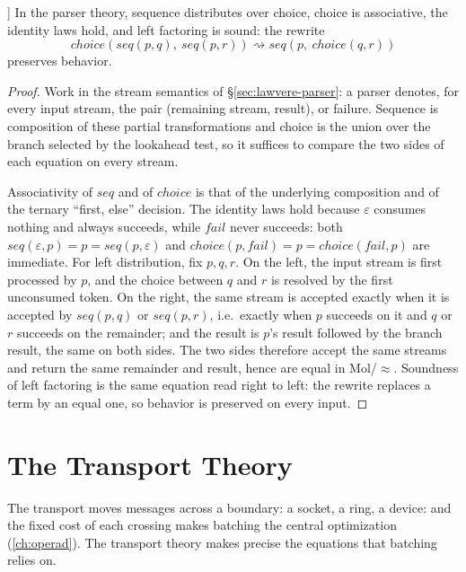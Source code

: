 \begin{theorem}[Parser theory (\autoref{thm:10}) [N]]\label{thm:10}
In the parser theory, sequence distributes over choice, choice is
associative, the identity laws hold, and left factoring is sound: the
rewrite
\[
\mathit{choice} (\mathit{seq} (p,q),\ \mathit{seq} (p,r)) \rightsquigarrow
\mathit{seq} (p,\ \mathit{choice} (q,r))
\]
preserves behavior.
\end{theorem}

\begin{proof}
Work in the stream semantics of \S\ref{sec:lawvere-parser}: a parser
denotes, for every input stream, the pair (remaining stream, result), or
failure. Sequence is composition of these partial transformations and
choice is the union over the branch selected by the lookahead test, so it
suffices to compare the two sides of each equation on every stream.

Associativity of $\mathit{seq}$ and of $\mathit{choice}$ is that of the
underlying composition and of the ternary ``first, else'' decision. The
identity laws hold because $\varepsilon$ consumes nothing and always
succeeds, while $\mathit{fail}$ never succeeds: both
$\mathit{seq} (\varepsilon,p) = p = \mathit{seq} (p,\varepsilon)$ and
$\mathit{choice} (p,\mathit{fail}) = p = \mathit{choice} (\mathit{fail},p)$
are immediate. For left distribution, fix $p,q,r$. On the left, the input
stream is first processed by $p$, and the choice between $q$ and $r$ is
resolved by the first unconsumed token. On the right, the same stream is
accepted exactly when it is accepted by $\mathit{seq} (p,q)$ or
$\mathit{seq} (p,r)$, i.e.\ exactly when $p$ succeeds on it and $q$ or $r$
succeeds on the remainder; and the result is $p$'s result followed by the
branch result, the same on both sides. The two sides therefore accept the
same streams and return the same remainder and result, hence are equal in
Mol/$\approx$. Soundness of left factoring is the same equation read right
to left: the rewrite replaces a term by an equal one, so behavior is
preserved on every input.
\end{proof}

\section{The Transport Theory}\label{sec:lawvere-transport}

The transport moves messages across a boundary: a socket, a ring, a
device: and the fixed cost of each crossing makes batching the central
optimization (\autoref{ch:operad}). The transport theory makes precise the
equations that batching relies on.

